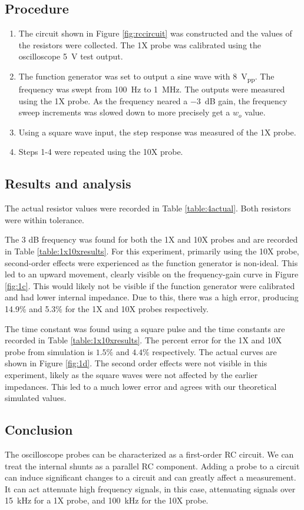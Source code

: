 \documentclass{report}
\newcommand{\pp}{_{pp}}
\newcommand{\Vpp}{\V\pp}
\begin{document}
\subsection{Procedure}
\begin{enumerate}
	\item The circuit shown in Figure \ref{fig:rccircuit} was constructed and the values of the resistors were collected. The 1X probe was calibrated using the oscilloscope \SI{5}{\V} test output.
	\item The function generator was set to output a sine wave with \SI{8}{\Vpp}. The frequency was swept from \SI{100}{\Hz} to \SI{1}{\MHz}. The outputs were measured using the 1X probe. As the frequency neared a \SI{-3}{\dB} gain, the frequency sweep increments was slowed down to more precisely get a $w_o$ value.
	\item Using a square wave input, the step response was measured of the 1X probe.
	\item Steps 1-4 were repeated using the 10X probe.
\end{enumerate}
\subsection{Results and analysis}
The actual resistor values were recorded in Table \ref{table:4actual}. Both resistors were within tolerance.

The 3 dB frequency was found for both the 1X and 10X probes and are recorded in Table \ref{table:1x10xresults}. For this experiment, primarily using the 10X probe, second-order effects were experienced as the function generator is non-ideal. This led to an upward movement, clearly visible on the frequency-gain curve in Figure \ref{fig:1c}. This would likely not be visible if the function generator were calibrated and had lower internal impedance. Due to this, there was a high error, producing 14.9\% and 5.3\% for the 1X and 10X probes respectively.

The time constant was found using a square pulse and the time constants are recorded in Table \ref{table:1x10xresults}. The percent error for the 1X and 10X probe from simulation is $1.5\%$ and $4.4\%$ respectively. The actual curves are shown in Figure \ref{fig:1d}. The second order effects were not visible in this experiment, likely as the square waves were not affected by the earlier impedances. This led to a much lower error and agrees with our theoretical simulated values.

\subsection{Conclusion}
The oscilloscope probes can be characterized as a first-order RC circuit. We can treat the internal shunts as a parallel RC component. Adding a probe to a circuit can induce significant changes to a circuit and can greatly affect a measurement. It can act attenuate high frequency signals, in this case, attenuating signals over \SI{15}{\kHz} for a 1X probe, and \SI{100}{\kHz} for the 10X probe. 
\end{document}
